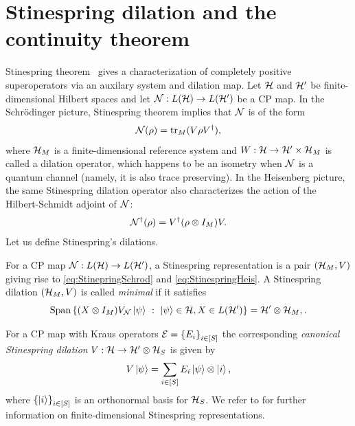 \documentclass[10pt]{article}
\DeclareMathOperator{\Span}{Span}
\newcommand{\tr}{\mathrm{tr}}
\newcommand{\ppp}[1]{\left\{#1\right\}}
\begin{document}
   
 \section{Stinespring dilation and the continuity theorem}\label{sec:Stinespring}
 Stinespring theorem~\cite{Stinespring1955Positive} gives a characterization of completely positive superoperators via an auxilary system and  dilation map.  Let ${\cal H}$ and ${\cal H}'$ be finite-dimensional Hilbert spaces and  let ${\cal N}:L({\cal H})\to L({\cal H}')$ be a CP map. In the Schr\"{o}dinger picture, Stinespring theorem implies that ${\cal N}$ is of the form 
 \begin{equation}
     \calN(\rho)=\tr_{M}(V\rho V^\dag),\label{eq:StinepringSchrod}
 \end{equation}
 where ${\cal H}_M$ is a finite-dimensional reference system and $W:{\cal H}\to {\cal H}'\times {\cal H}_M $ is called a dilation operator, which happens to be an isometry when ${\cal N}$ is a quantum channel (namely, it is also trace preserving). In the Heisenberg picture, the same Stinespring dilation operator also characterizes the action of the Hilbert-Schmidt adjoint of ${\cal N}$:
 \begin{equation}
     {\cal N}^{\dag}(\rho)=V^\dag (\rho\otimes I_M) V.\label{eq:StinespringHeis}
 \end{equation}
 Let us define Stinespring's dilations.
  \begin{definition} \label{def:Stinespring} For a CP map ${\cal N}:L({\cal H})\to L({\cal H}')$,  a Stinespring representation is a pair $({\cal H}_M,V)$ giving rise to \eqref{eq:StinepringSchrod} and \eqref{eq:StinespringHeis}. 
  A Stinespring dilation $({\cal H}_M,V)$ is called \emph{minimal} if it satisfies
 \begin{equation}
     \Span\ppp{(X\otimes I_M)V_{\calN} \ket{\psi} ~:~ \ket{\psi}\in \calH, X\in L(\calH')}=\calH'\otimes \calH_M,\label{eq:minStinespring}. 
 \end{equation}
  \end{definition}
 For a CP map with Kraus operators $\calE=\ppp{E_i}_{i\in [S]}$ the corresponding \textit{canonical Stinespring dilation} $V:{\cal H}\to {\cal H}'\otimes {\cal H}_{S}$ is given by
 \[V\ket{\psi}=\sum_{i\in[S]}E_i\ket{\psi}  \otimes \ket{i}, \]
 where $\ppp{\ket{i}}_{i\in [S]}$ is an orthonormal basis for ${\cal H}_{S}$. We refer to \cite{watrous2018theory,wilde2017quantum} for  further information on finite-dimensional Stinespring representations.
\end{document}
